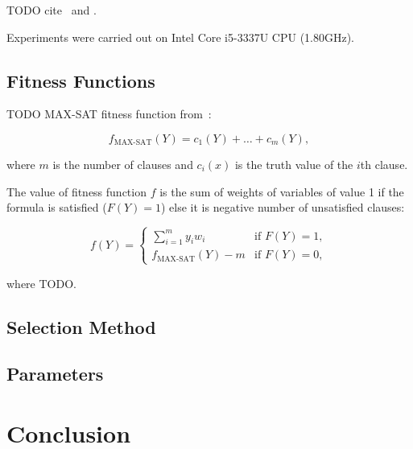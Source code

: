 \documentclass{article}
\begin{document}
TODO cite~\cite{gottlieb2002} and \cite{ellerweg2004}.

Experiments were carried out on Intel Core i5-3337U CPU (1.80GHz).

\subsection{Fitness Functions}

TODO MAX-SAT fitness function from~\cite{dejong1989}:

$$f_{\text{MAX-SAT}}(Y) = c_1(Y) + \dots + c_m(Y),$$

where $m$ is the number of clauses and $c_i(x)$ is the truth value of the $i$th
clause.

The value of fitness function $f$ is the sum of weights of variables of value 1
if the formula is satisfied ($F(Y) = 1$)
else it is negative number of unsatisfied clauses:

$$
f(Y) = 
\begin{cases} 
    \sum_{i = 1}^m y_i w_i & \text{if } F(Y) = 1, \\
    f_{\text{MAX-SAT}}(Y) - m & \text{if } F(Y) = 0,
\end{cases}
$$

where TODO.

\subsection{Selection Method}

\subsection{Parameters}

\section{Conclusion}




\end{document}
